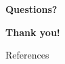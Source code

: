 \documentclass[11pt]{beamer}
\begin{document}
\begin{frame}
\begin{center}
{\Large \textbf{Questions?}}
\end{center}
\end{frame}

\begin{frame}
\begin{center}
{\Large \textbf{Thank you!}}
\end{center}
\end{frame}

\begin{frame}{References}
\begin{tiny}


\end{tiny}
\end{frame}
\end{document}
